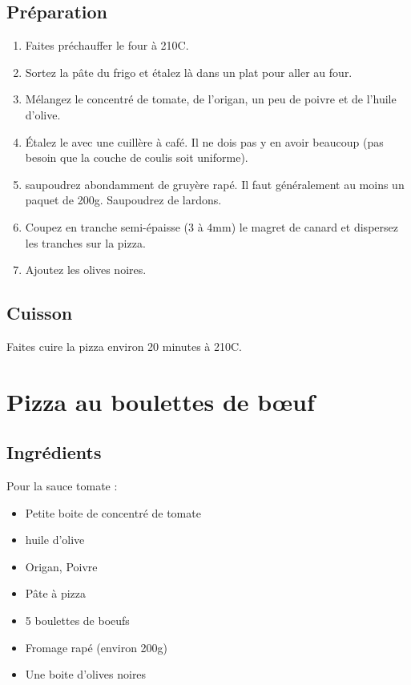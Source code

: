 \subsection*{Préparation}
\begin{enumerate}
\item Faites préchauffer le four à 210\degres C.
\item Sortez la pâte du frigo et étalez là dans un plat pour aller au four.
\item Mélangez le concentré de tomate, de l'origan, un peu de poivre et de l'huile d'olive.
\item Étalez le avec une cuillère à café. Il ne dois pas y en avoir beaucoup (pas besoin que la couche de coulis soit uniforme).
\item saupoudrez abondamment de gruyère rapé. Il faut généralement au moins un paquet de 200g. Saupoudrez de lardons.
\item Coupez en tranche semi-épaisse (3 à 4mm) le magret de canard et dispersez les tranches sur la pizza.
\item Ajoutez les olives noires.
\end{enumerate}

\subsection*{Cuisson}
Faites cuire la pizza environ 20 minutes à 210\degres C.

\newpage
\section{Pizza au boulettes de bœuf}
\subsection*{Ingrédients}
Pour la sauce tomate :
\begin{itemize}
\item Petite boite de concentré de tomate
\item huile d'olive
\item Origan, Poivre
\end{itemize}

\begin{itemize}
\item Pâte à pizza
\item 5 boulettes de boeufs
\item Fromage rapé (environ 200g)
\item Une boite d'olives noires
\end{itemize}

